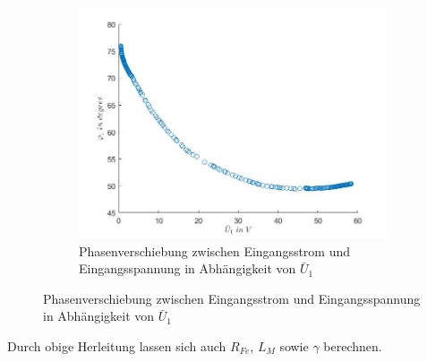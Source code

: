 \documentclass[a4paper, 12pt,]{scrartcl}
\begin{document}
\begin{figure}[H]
\begin{adjustwidth}{-1em}{7em}
\end{adjustwidth}\centering
\begin{adjustwidth}{-1em}{7em}
  \begin{subfigure}[b]{0.5\textwidth}
    \includegraphics[width=\textwidth]{U11phi11}
    \caption{Phasenverschiebung zwischen Eingangsstrom und Eingangsspannung in Abhängigkeit von $\bar{U}_1$}
    \label{fig:}
  \end{subfigure} 
\end{adjustwidth}
\end{figure}
Durch obige Herleitung lassen sich auch $R_{Fe}$, $L_M$ sowie $\gamma$ berechnen.
\end{document}
